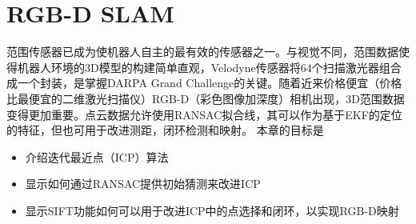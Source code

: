 

\chapter{RGB-D SLAM} 
\label{rgbd-slam}

范围传感器已成为使机器人自主的最有效的传感器之一。与视觉不同，范围数据使得机器人环境的3D模型的构建简单直观，Velodyne传感器将64个扫描激光器组合成一个封装，是掌握DARPA Grand Challenge的关键。随着近来价格便宜（价格比最便宜的二维激光扫描仪）RGB-D（彩色图像加深度）相机出现，3D范围数据变得更加重要。点云数据允许使用RANSAC拟合线，其可以作为基于EKF的定位的特征，但也可用于改进测距，闭环检测和映射。 本章的目标是

\begin{itemize}

\item 介绍迭代最近点（ICP）算法
\item 显示如何通过RANSAC提供初始猜测来改进ICP
\item 显示SIFT功能如何可以用于改进ICP中的点选择和闭环，以实现RGB-D映射
\end{itemize}

